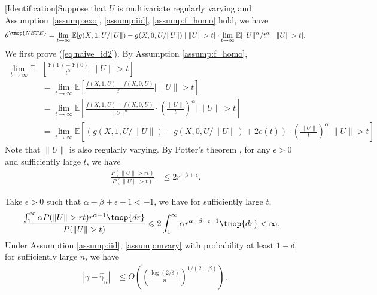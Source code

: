   [Identification]\label{prop:id}Suppose that $U$
  is multivariate regularly varying and Assumption~\ref{assump:exo}, \ref{assump:iid}, \ref{assump:f_homo}
  hold, we have
  \begin{align*}
    \theta^{\tmop{NETE}} = \lim_{t \rightarrow \infty} \mathbb{E}[g (X, 1, U
    /\|U\|) - g (X, 0, U /\|U\|) \mid \|U\|> t] \cdot \lim_{t \rightarrow
    \infty} \mathbb{E}[\|U\|^{\alpha} / t^{\alpha} \mid \|U\|> t] .
  \end{align*}
We first prove (\ref{eq:naive_id2}). By Assumption \ref{assump:f_homo},
\begin{align*}
  \lim_{t \rightarrow \infty} \mathbb{E} &\left[ \frac{Y (1) - Y
  (0)}{t^{\alpha}} \mid \|U\|> t \right] \\
  & = \lim_{t \rightarrow \infty}
  \mathbb{E} \left[ \frac{f (X, 1, U) - f (X, 0, U)}{t^{\alpha}} \mid \|U\|> t
  \right] \\
  & = \lim_{t \rightarrow \infty} \mathbb{E} \left[ \frac{f (X, 1, U) - f (X,
  0, U)}{\|U\|^{\alpha}} \cdot \left( \frac{\|U\|}{t} \right)^{\alpha} \mid
  \|U\|> t \right]\\
  & = \lim_{t \rightarrow \infty} \mathbb{E} \left[ (g (X, 1, U / \| U \|) -
  g (X, 0, U / \| U \|) + 2 e (t)) \cdot \left( \frac{\|U\|}{t}
  \right)^{\alpha} \mid \|U\|> t \right]
\end{align*}
Note that $\| U \|$ is also regularly varying. By Potter's theorem \cite[Theorem 1.56]{bingham1989regular}, for any $\epsilon >0$ and sufficiently large $t$, we have
\begin{align*}
  \frac{P (\| U \| > {rt})}{P (\| U \| > t)} & \leqslant 2 r^{-\beta + \epsilon} .
\end{align*}

Take $\epsilon > 0$ such that $\alpha -\beta + \epsilon - 1 < - 1$, we have for sufficiently large $t$, 
\begin{align*}
  \frac{\int_1^{\infty} \alpha P (\| U \| > {rt}) r^{\alpha - 1}
  \tmop{dr}}{P (\| U \| > t)} & \leqslant 2\int^{\infty}_1 \alpha r^{\alpha -\beta + \epsilon - 1} \tmop{dr} < \infty .
\end{align*}
  \label{lemma:mu_rate}Under Assumption \ref{assump:iid}, \ref{assump:mvary}
  with probability at least $1 - \delta$, for sufficiently large $n$, we have
  \begin{align*}
    | \gamma - \hat{\gamma}_n | & \leqslant O \left( \left( \frac{\log (2 /
    \delta)}{n} \right)^{1 / (2 + \beta)} \right),
  \end{align*}
  
